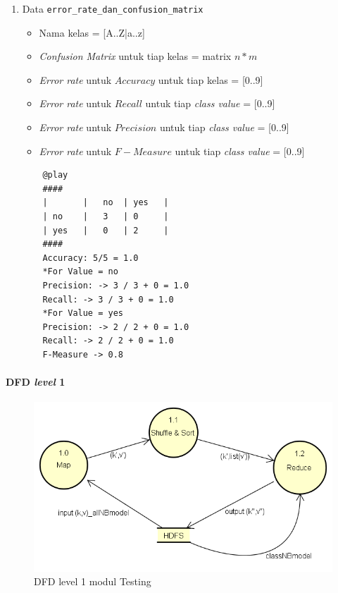 \begin{enumerate}
	\item{Data \verb|error_rate_dan_confusion_matrix|}
	\begin{itemize}
		\item Nama kelas = [A..Z|a..z]
		\item \textit{Confusion Matrix} untuk tiap kelas = matrix $n*m$
		\item \textit{Error rate} untuk $Accuracy$ untuk tiap kelas = [0..9]
		\item \textit{Error rate} untuk $Recall$ untuk tiap \textit{class value} = [0..9]
		\item \textit{Error rate} untuk $Precision$ untuk tiap \textit{class value} = [0..9]
		\item \textit{Error rate} untuk $F-Measure$ untuk tiap \textit{class value} = [0..9]
	\end{itemize}
	\begin{lstlisting}
	@play
	####
	|		|	no	| yes	|
	| no	|	3	| 0		|
	| yes	|	0	| 2		|
	####
	Accuracy: 5/5 = 1.0
	*For Value = no
	Precision: -> 3 / 3 + 0 = 1.0
	Recall: -> 3 / 3 + 0 = 1.0 
	*For Value = yes
	Precision: -> 2 / 2 + 0 = 1.0
	Recall: -> 2 / 2 + 0 = 1.0
	F-Measure -> 0.8
	\end{lstlisting}
	
\end{enumerate}


\paragraph{DFD \textit{level} 1}
\begin{figure}[H]
	\centering
	\includegraphics[scale=0.65]{Diagram/DFD_1_0_Testing_rdmodel}
	\caption[DFD level 1 modul Testing]{DFD level 1 modul Testing}
	\label{fig:DFD level 1 modul Testing}
\end{figure}

